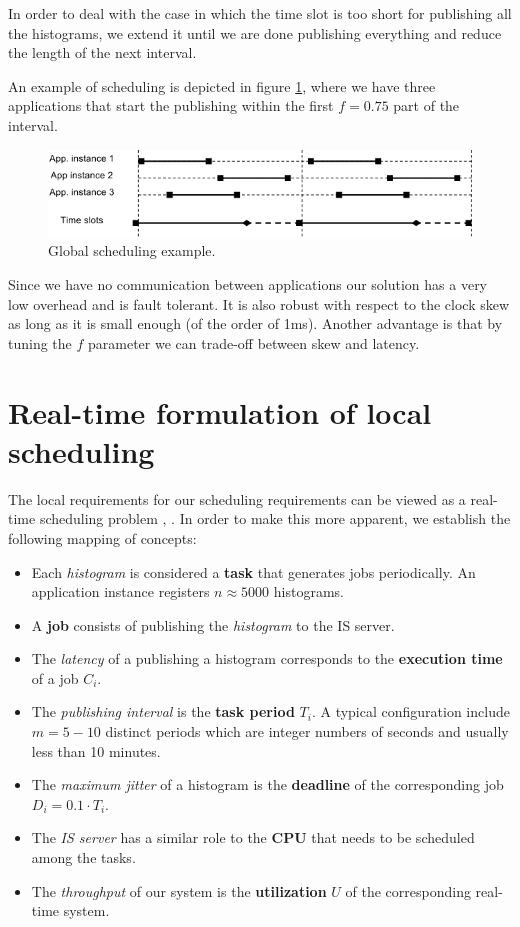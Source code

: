 In order to deal with the case in which the time slot is too short for publishing all the histograms, we extend it until we are done publishing everything and reduce the length of the next interval.

An example of scheduling is depicted in figure \ref{fig:local_sched}, where we have three applications that start the publishing within the first $f=0.75$ part of the interval.

\begin{figure}[ht!]
\centering
\includegraphics[scale=0.6]{Images/local_sched.png}
\caption{Global scheduling example.}
\label{fig:local_sched}
\end{figure}

Since we have no communication between applications our solution has a very low overhead and is fault tolerant. It is also robust with respect to the clock skew as long as it is small enough (of the order of 1ms). Another advantage is that by tuning the $f$ parameter we can trade-off between skew and latency. 

\section{Real-time formulation of local scheduling}

The local requirements for our scheduling requirements can be viewed as a real-time scheduling problem \citep{liu1973scheduling}, \citep{sha2004real}. In order to make this more apparent, we establish the following mapping of concepts:
\begin{itemize}
\item Each \emph{histogram} is considered a {\bf task} that generates jobs periodically. An application instance registers $n \approx 5000$ histograms.
\item A {\bf job} consists of publishing the \emph{histogram} to the IS server.
\item The \emph{latency} of a publishing a histogram corresponds to the {\bf execution time} of a job $C_i$. 
\item The \emph{publishing interval} is the {\bf task period} $T_i$. A typical configuration include $m=5-10$ distinct periods which are integer numbers of seconds and usually less than 10 minutes.
\item The \emph{maximum jitter} of a histogram is the {\bf deadline} of the corresponding job $D_i=0.1\cdot T_i$.
\item The \emph{IS server} has a similar role to the {\bf CPU} that needs to be scheduled among the tasks.
\item The \emph{throughput} of our system is the {\bf utilization} $U$ of the corresponding real-time system.
\end{itemize}

